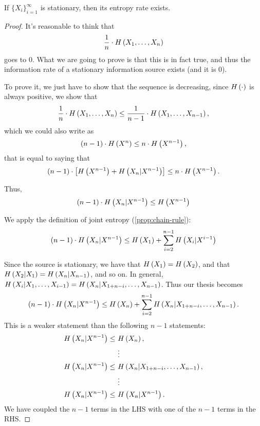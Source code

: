 \begin{thm}
	If $\{X_i\}_{i = 1}^\infty$ is stationary, then its entropy rate exists.
\end{thm}

\begin{proof}
	It's reasonable to think that
	\begin{equation*}
		\frac{1}{n} \cdot H\left({X_1, \dots, X_n}\right)
	\end{equation*}
	goes to 0.
	What we are going to prove is that this is in fact true, and thus the information rate of a stationary information source exists (and it is 0).

	To prove it, we just have to show that the sequence is decreasing, since $H\left({\cdot}\right)$ is always positive, \ie we show that
	\begin{equation*}
		\frac{1}{n} \cdot H\left({X_1, \dots, X_n}\right)
		\le
		\frac{1}{n-1} \cdot H\left({X_1, \dots, X_{n-1}}\right),
	\end{equation*}
	which we could also write as
	\begin{equation*}
		(n-1) \cdot H\left({X^n}\right)
		\le
		n \cdot H\left({X^{n-1}}\right),
	\end{equation*}
	that is equal to saying that
	\begin{equation*}
		(n-1) \cdot \left[ H\left({X^{n-1}}\right) + H\left({X_n | X^{n-1}}\right) \right]
		\le
		n \cdot H\left({X^{n-1}}\right).
	\end{equation*}

	Thus,
	\begin{equation*}
		(n-1) \cdot H\left({X_n | X^{n-1}}\right) \le H\left({X^{n-1}}\right)
	\end{equation*}

	We apply the definition of joint entropy (\cref{prop:chain-rule}):
	\begin{equation*}
		(n-1) \cdot H\left({X_n | X^{n-1}}\right)
		\le
		H\left({X_1}\right) + \sum_{i=2}^{n-1} H\left({X_i | X^{i-1}}\right)
	\end{equation*}

	Since the source is stationary, we have that $H\left({X_1}\right) = H\left({X_2}\right)$, and that $H\left({X_2 | X_1}\right) = H\left({X_n | X_{n-1}}\right)$, and so on.
	In general, $H\left({X_i | X_1, \dots, X_{i-1}}\right) = H\left({X_n | X_{1+n-i}, \dots, X_{n-1}}\right)$.
	Thus our thesis becomes
	\begin{equation*}
		(n-1) \cdot H\left({X_n | X^{n-1}}\right)
		\le
		H\left({X_n}\right) + \sum_{i=2}^{n-1} H\left({X_n | X_{1+n-i}, \dots, X_{n-1}}\right).
	\end{equation*}
	This is a weaker statement than the following $n-1$ statements:
	\begin{align*}
		H\left({X_n | X^{n-1}}\right) \le~& H\left({X_n}\right),
		\\
		& \vdots
		\\
		H\left({X_n | X^{n-1}}\right) \le~& H\left({X_n | X_{1+n-i}, \dots, X_{n-1}}\right),
		\\
		& \vdots
		\\
		H\left({X_n | X^{n-1}}\right) \le~& H\left({X_n | X^{n-1}}\right).
	\end{align*}
	We have coupled the $n-1$ terms in the \ac{LHS} with one of the $n-1$ terms in the \ac{RHS}.


\end{proof}
